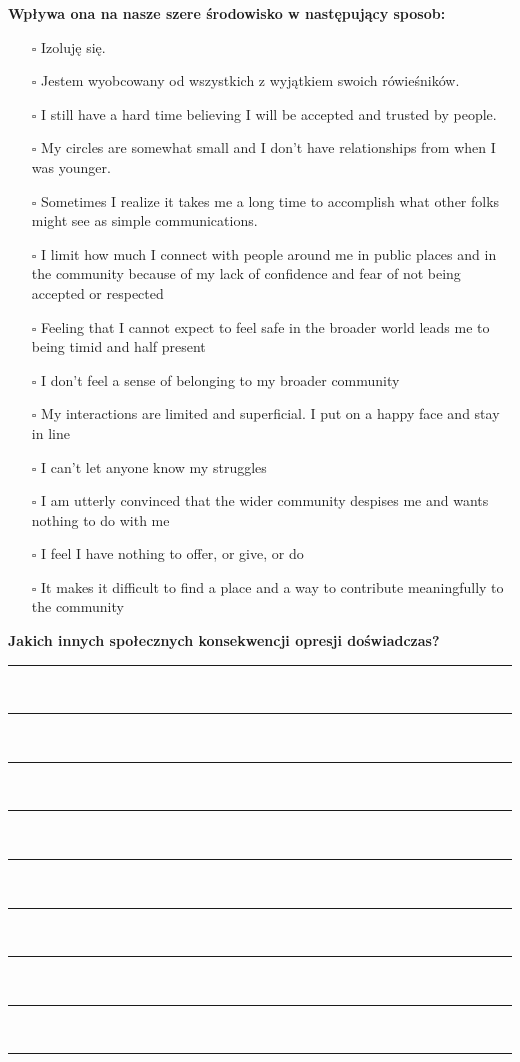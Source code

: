 \newpage
\noindent
\textbf{\large{Wpływa ona na nasze szere środowisko w następujący sposob:}}
\begin{multicols}{2}
\begin{itemize}
\item[$\square$]{Izoluję się.}
\item[$\square$]{Jestem wyobcowany od wszystkich z wyjątkiem swoich rówieśników.}
\item[$\square$]{I still have a hard time believing I will be accepted and trusted by people.}
\item[$\square$]{My circles are somewhat small and I don’t have relationships from when I was younger.}
\item[$\square$]{Sometimes I realize it takes me a long time to accomplish what other folks might see as simple communications.}
\item[$\square$]{I limit how much I connect with people around me in public places and in the community because of my lack of confidence and fear of not being accepted or respected}
\item[$\square$]{Feeling that I cannot expect to feel safe in the broader world leads me to being timid and half present}
\item[$\square$]{I don’t feel a sense of belonging to my broader community}
\item[$\square$]{My interactions are limited and superficial. I put on a happy face and stay in line}
\item[$\square$]{I can’t let anyone know my struggles}
\item[$\square$]{I am utterly convinced that the wider community despises me and wants nothing to do with me}
\item[$\square$]{I feel I have nothing to offer, or give, or do}
\item[$\square$]{It makes it difficult to find a place and a way to contribute meaningfully to the community}
\end{itemize}
\end{multicols}

\noindent
\textcolor{ProcessBlue}{\textbf{\Large{Jakich innych społecznych konsekwencji opresji doświadczas?}}}\\
\noindent\rule{\textwidth}{1pt}\\
\noindent\rule{\textwidth}{1pt}\\
\noindent\rule{\textwidth}{1pt}\\
\noindent\rule{\textwidth}{1pt}\\
\noindent\rule{\textwidth}{1pt}\\
\noindent\rule{\textwidth}{1pt}\\
\noindent\rule{\textwidth}{1pt}\\
\noindent\rule{\textwidth}{1pt}\\
\noindent\rule{\textwidth}{1pt}\\\\


